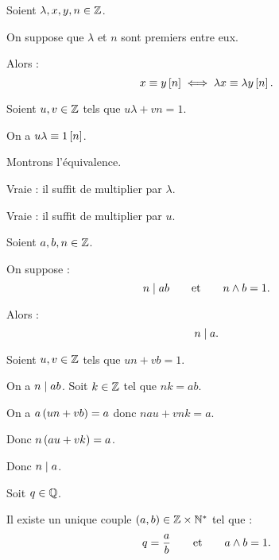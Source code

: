 \begin{prop}
Soient \(\lambda,x,y,n\in\mathbb{Z}\).

On suppose que \(\lambda\) et \(n\) sont premiers entre eux.

Alors : \[x\equiv y\left[n\right]\iff\lambda x\equiv\lambda y\left[n\right].\]
\end{prop}

\begin{dem}
Soient \(u,v\in\mathbb{Z}\) tels que \(u\lambda+vn=1\).

On a \(u\lambda\equiv1\left[n\right]\).

Montrons l'équivalence.

\impdir Vraie : il suffit de multiplier par \(\lambda\).

\imprec Vraie : il suffit de multiplier par \(u\).
\end{dem}

\begin{lem}
Soient \(a,b,n\in\mathbb{Z}\).

On suppose : \[n\mid ab\qquad\text{et}\qquad n\land b=1.\]

Alors : \[n\mid a.\]
\end{lem}

\begin{dem}
Soient \(u,v\in\mathbb{Z}\) tels que \(un+vb=1\).

On a \(n\mid ab\). Soit \(k\in\mathbb{Z}\) tel que \(nk=ab\).

On a \(a\left(un+vb\right)=a\) donc \(nau+vnk=a\).

Donc \(n\left(au+vk\right)=a\).

Donc \(n\mid a\).
\end{dem}

\begin{rem}
Soit \(q\in\mathbb{Q}\).

Il existe un unique couple \(\left(a,b\right)\in\mathbb{Z}\times\mathbb{N}^*\) tel que : \[q=\dfrac{a}{b}\qquad\text{et}\qquad a\land b=1.\]
\end{rem}

